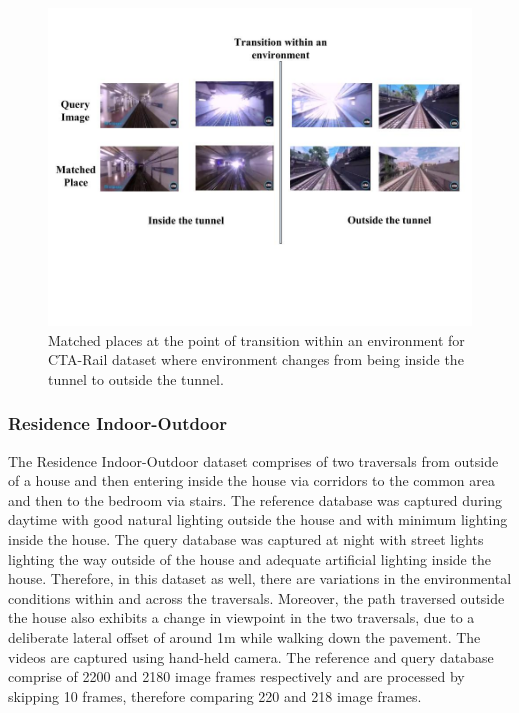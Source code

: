 \documentclass[letterpaper, 10 pt, conference]{ieeeconf}  %
\begin{document}
\begin{figure}
 \includegraphics[clip, trim=0.5cm 8cm 1cm 2.5cm,scale=0.25]{PlaceMatchesAtTransition}
 \caption{Matched places at the point of transition within an environment for CTA-Rail dataset where environment changes from being inside the tunnel to outside the tunnel.}
 \label{fig:placeMatches}
\end{figure}

\subsubsection{Residence Indoor-Outdoor}
The Residence Indoor-Outdoor dataset comprises of two traversals from outside of a house and then entering inside the house via corridors to the common area and then to the bedroom via stairs. The reference database was captured during daytime with good natural lighting outside the house and with minimum lighting inside the house. The query database was captured at night with street lights lighting the way outside of the house and adequate artificial lighting inside the house. Therefore, in this dataset as well, there are variations in the environmental conditions within and across the traversals. Moreover, the path traversed outside the house also exhibits a change in viewpoint in the two traversals, due to a deliberate lateral offset of around 1m while walking down the pavement. The videos are captured using hand-held camera. The reference and query database comprise of 2200 and 2180 image frames respectively and are processed by skipping 10 frames, therefore comparing 220 and 218 image frames.
\end{document}
